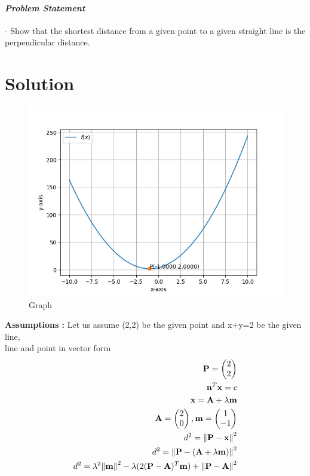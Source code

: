 \documentclass[10pt, a4paper]{article}
\title{\mytitle}
\author{\myauthor\hspace{1em}\\\contact\\IITH\hspace{0.5em}-\hspace{0.5em}\mymodule}
\date{}
\newcommand{\myvec}[1]{\ensuremath{\begin{pmatrix}#1\end{pmatrix}}}
\let\vec\mathbf
\begin{document}
	\maketitle
\paragraph{\textit{Problem Statement}}- Show that the shortest distance from a given point to a given straight line is the perpendicular distance.

\section*{\large Solution}
\begin{figure}[H]
\centering
\includegraphics[width=1\columnwidth]{Figure1.png}
\caption{Graph}
\label{fig:triangle}
\end{figure}
\textbf{Assumptions :}
Let us assume (2,2) be the given point and x+y=2 be the given line,\\
line and point in vector form \\
\begin{align}
\vec{P} = \myvec{2\\2}\\
\vec{n}^T\vec{x}=c\\
\vec{x}=\vec{A}+\lambda \vec{m}\\
\vec{A} = \myvec{2\\0}, \vec{m} = \myvec{1\\-1}\\
d^2 = \norm{\vec{P}-\vec{x}}^2\\
d^2 = \norm{\vec{P}-(\vec{A}+\lambda \vec{m})}^2\\
d^2 = \lambda^2\norm{\vec{m}}^2-\lambda(2(\vec{P}-\vec{A})^T\vec{m})+\norm{\vec{P}-\vec{A}}^2
\end{align}
\end{document}
